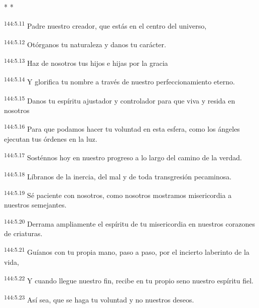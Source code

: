 \begin{center}
	\par* * *
\end{center}

\begin{center}
\par
\textsuperscript{144:5.11} Padre nuestro creador, que estás en el centro del universo,

\par
\textsuperscript{144:5.12} Otórganos tu naturaleza y danos tu carácter.

\par
\textsuperscript{144:5.13} Haz de nosotros tus hijos e hijas por la gracia

\par
\textsuperscript{144:5.14} Y glorifica tu nombre a través de nuestro perfeccionamiento eterno.

\par
\textsuperscript{144:5.15} Danos tu espíritu ajustador y controlador para que viva y resida en nosotros

\par
\textsuperscript{144:5.16} Para que podamos hacer tu voluntad en esta esfera, como los ángeles ejecutan tus órdenes en la luz.

\par
\textsuperscript{144:5.17} Sosténnos hoy en nuestro progreso a lo largo del camino de la verdad.

\par
\textsuperscript{144:5.18} Líbranos de la inercia, del mal y de toda transgresión pecaminosa.

\par
\textsuperscript{144:5.19} Sé paciente con nosotros, como nosotros mostramos misericordia a nuestros semejantes.

\par
\textsuperscript{144:5.20} Derrama ampliamente el espíritu de tu misericordia en nuestros corazones de criaturas.

\par
\textsuperscript{144:5.21} Guíanos con tu propia mano, paso a paso, por el incierto laberinto de la vida,

\par
\textsuperscript{144:5.22} Y cuando llegue nuestro fin, recibe en tu propio seno nuestro espíritu fiel.

\par
\textsuperscript{144:5.23} Así sea, que se haga tu voluntad y no nuestros deseos.
\end{center}

